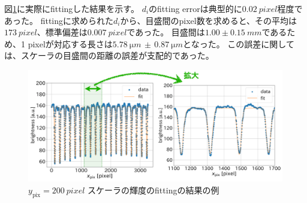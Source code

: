 \documentclass[../../main.tex]{subfiles}
\begin{document}
図\ref{fig:wiresag_scaler_fitting}に実際にfittingした結果を示す。
$d_i$のfitting errorは典型的に$\SI{0.02}{pixel}$程度であった。
fittingに求められた$d_i$から、目盛間のpixel数を求めると、その平均は$\SI{173}{pixel}$、標準偏差は$\SI{0.007}{pixel}$であった。
目盛間は$1.00\pm\SI{0.15}{mm}$であるため、1 pixelが対応する長さは$\SI{5.78}{\micro m}\,\pm\,\SI{0.87}{\micro m}$となった。
この誤差に関しては、スケーラの目盛間の距離の誤差が支配的であった。
\begin{figure}[H]
    \centering
    \includegraphics[width=1.0\textwidth]{wiresag/wiresag_scaler_fitting.pdf}
    \caption{$y_{\mathrm{pix}}=\SI{200}{pixel}$ スケーラの輝度のfittingの結果の例}
    \label{fig:wiresag_scaler_fitting}
\end{figure}
\end{document}
